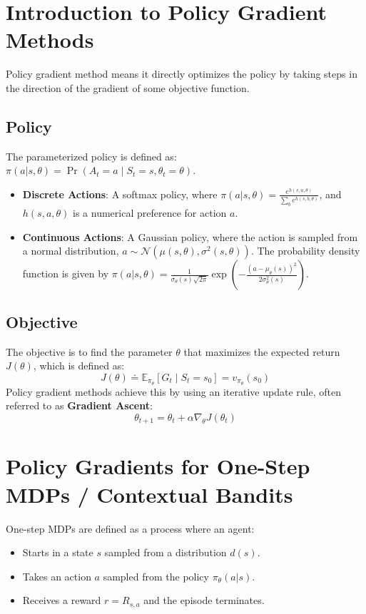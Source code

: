 \documentclass[12pt]{article}
\begin{document}
\section{Introduction to Policy Gradient Methods }

Policy gradient method means it directly optimizes the policy by taking steps in the direction of the gradient of some objective function.

\subsection{Policy}
The parameterized policy is defined as: $\pi(a|s, \theta) = \Pr(A_t = a \mid S_t = s, \theta_t = \theta)$.

\begin{itemize}
    \item \textbf{Discrete Actions}: A softmax policy, where $\pi(a|s, \theta) = \frac{e^{h(s,a,\theta)}}{\sum_b e^{h(s,b,\theta)}}$, and $h(s,a,\theta)$ is a numerical preference for action $a$.
    \item \textbf{Continuous Actions}: A Gaussian policy, where the action is sampled from a normal distribution, $a \sim \mathcal{N}(\mu(s,\theta), \sigma^2(s,\theta))$. The probability density function is given by $\pi(a|s,\theta) = \frac{1}{\sigma_\theta(s) \sqrt{2\pi}} \exp\left( -\frac{(a - \mu_\theta(s))^2}{2\sigma_\theta^2(s)} \right)$.
\end{itemize}

\subsection{Objective}
The objective is to find the parameter $\theta$ that maximizes the expected return $J(\theta)$, which is defined as:
$$
J(\theta) \doteq \mathbb{E}_{\pi_\theta}[G_t \mid S_t = s_0] = v_{\pi_\theta}(s_0)
$$
Policy gradient methods achieve this by using an iterative update rule, often referred to as \textbf{Gradient Ascent}:
$$
\theta_{t+1} = \theta_t + \alpha \nabla_\theta J(\theta_t)
$$

\section{Policy Gradients for One-Step MDPs / Contextual Bandits}

One-step MDPs are defined as a process where an agent:
\begin{itemize}
    \item Starts in a state $s$ sampled from a distribution $d(s)$.
    \item Takes an action $a$ sampled from the policy $\pi_\theta(a|s)$.
    \item Receives a reward $r = R_{s,a}$ and the episode terminates.
\end{itemize}
\end{document}

